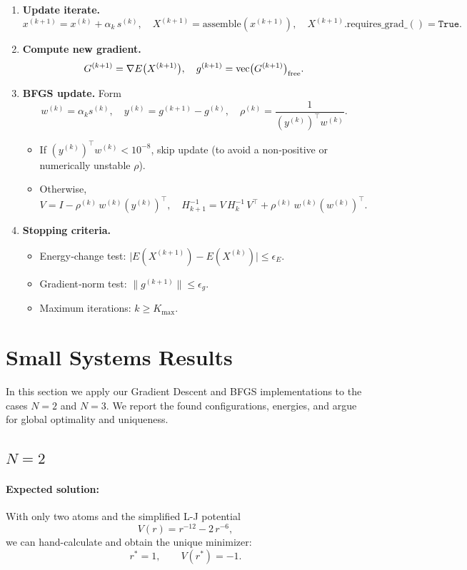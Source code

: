 \documentclass[11pt,onecolumn]{article}
\begin{document}
\begin{enumerate}
  \item \textbf{Update iterate.}
    \[
      x^{(k+1)} = x^{(k)} + \alpha_k\,s^{(k)},
      \quad
      X^{(k+1)} = \text{assemble}(x^{(k+1)}),
      \quad
      X^{(k+1)}.\mathrm{requires\_grad\_()} = \texttt{True}.
    \]
  \item \textbf{Compute new gradient.}  
    \[
      G^{(k+1)} = \nabla E\bigl(X^{(k+1)}\bigr),
      \quad
      g^{(k+1)} = \text{vec}\bigl(G^{(k+1)}\bigr)_{\rm free}.
    \]
  \item \textbf{BFGS update.}  
    Form
    \[
      w^{(k)}=\alpha_k s^{(k)},\quad
      y^{(k)} = g^{(k+1)} - g^{(k)},\quad
      \rho^{(k)} = \frac{1}{(y^{(k)})^\top w^{(k)}}.
    \]
    \begin{itemize}
      \item If \((y^{(k)})^\top w^{(k)} < 10^{-8}\), skip update (to avoid a non‑positive or numerically unstable \(\rho\)).
      \item Otherwise,
        \[
          V = I - \rho^{(k)}\,w^{(k)} (y^{(k)})^\top,\quad
          H_{k+1}^{-1}
          = V\,H_k^{-1}\,V^\top
            + \rho^{(k)}\,w^{(k)} (w^{(k)})^\top.
        \]
    \end{itemize}
  \item \textbf{Stopping criteria.}
    \begin{itemize}
      \item {Energy‐change test:} 
        \(\bigl|E(X^{(k+1)}) - E(X^{(k)})\bigr|\le\epsilon_E\).
      \item {Gradient‐norm test:} 
        \(\|g^{(k+1)}\|\le\epsilon_g\).
      \item {Maximum iterations:} \(k\ge K_{\max}\).
    \end{itemize}
\end{enumerate}

\section{Small Systems Results}

In this section we apply our Gradient Descent and BFGS implementations to the cases \(N=2\) and \(N=3\).  We report the found configurations, energies, and argue for global optimality and uniqueness.

\subsection{\(N=2\)}

\paragraph{Expected solution:}  
With only two atoms and the simplified L-J potential
\[
  V(r) = r^{-12} - 2\,r^{-6},
\]
we can hand-calculate and obtain the unique minimizer:
\[
  r^* = 1,\qquad V(r^*) = -1.
\]
\end{document}
